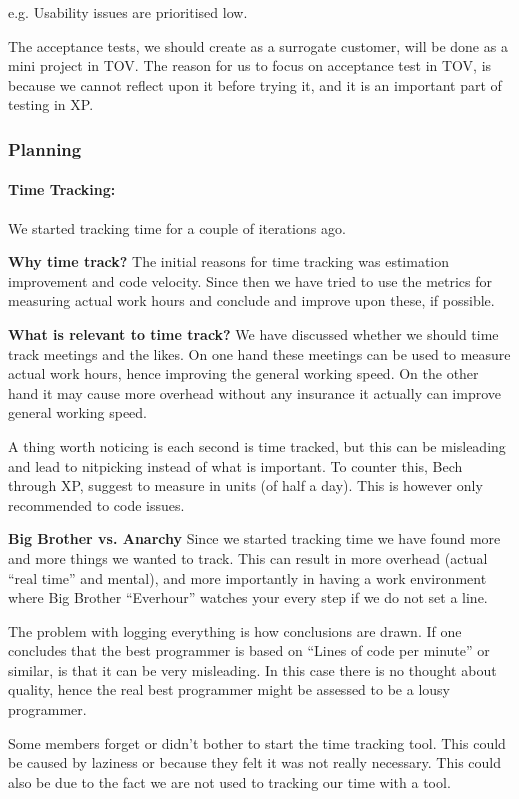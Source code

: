e.g. Usability issues are prioritised low.

The acceptance tests, we should create as a surrogate customer, will be done as a mini project in TOV. The reason for us to focus on acceptance test in TOV, is because we cannot reflect upon it before trying it, and it is an important part of testing in XP.

\subsubsection{Planning}
\paragraph{Time Tracking:}
We started tracking time for a couple of iterations ago.

\textbf{Why time track?}
The initial reasons for time tracking was estimation improvement and code velocity.
Since then we have tried to use the metrics for measuring actual work hours and conclude and improve upon these, if possible.

\textbf{What is relevant to time track?}
We have discussed whether we should time track meetings and the likes. On one hand these meetings can be used to measure actual work hours, hence improving the general working speed. On the other hand it may cause more overhead without any insurance it actually can improve general working speed. 

A thing worth noticing is each second is time tracked, but this can be misleading and lead to nitpicking instead of what is important. To counter this, Bech through XP, suggest to measure in units (of half a day). This is however only recommended to code issues. 

\textbf{Big Brother vs. Anarchy}
Since we started tracking time we have found more and more things we wanted to track. This can result in more overhead (actual “real time” and mental), and more importantly in having a work environment where Big Brother “Everhour” watches your every step if we do not set a line.

The problem with logging everything is how conclusions are drawn. If one concludes that the best programmer is based on “Lines of code per minute” or similar, is that it can be very misleading. In this case there is no thought about quality, hence the real best programmer might be assessed to be a lousy programmer.

Some members forget or didn’t bother to start the time tracking tool. This could be caused by laziness or because they felt it was not really necessary. This could also be due to the fact we are not used to tracking our time with a tool.

